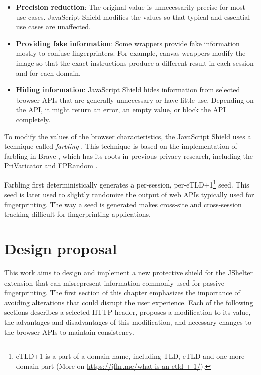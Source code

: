 \begin{itemize}
	\item \textbf{Precision reduction}: The original value is unnecessarily precise for most use cases. JavaScript Shield modifies the values so that typical and essential use cases are unaffected.
	\item \textbf{Providing fake information}: Some wrappers provide fake information mostly to confuse fingerprinters. For example, canvas wrappers modify the image so that the exact instructions produce a different result in each session and for each domain.
	\item \textbf{Hiding information}: JavaScript Shield hides information from selected browser APIs that are generally unnecessary or have little use. Depending on the API, it might return an error, an empty value, or block the API completely.
\end{itemize}

To modify the values of the browser characteristics, the JavaScript Shield uses a technique called \emph{farbling} \cite{JShelterPaper}. This technique is based on the implementation of farbling in Brave \cite{BraveFingerprintingDefences2}, which has its roots in previous privacy research, including the PriVaricator \cite{PriVaricator} and FPRandom \cite{FPRandom}.

Farbling first deterministically generates a per-session, per-eTLD+1\footnote{eTLD+1 is a part of a domain name, including TLD, eTLD and one more domain part (More on \url{https://jfhr.me/what-is-an-etld-+-1/}).} seed. This seed is later used to slightly randomize the output of web APIs typically used for fingerprinting. The way a seed is generated makes cross-site and cross-session tracking difficult for fingerprinting applications.


\chapter{Design proposal}
\label{Chapter:Design}

This work aims to design and implement a new protective shield for the JShelter extension that can misrepresent information commonly used for passive fingerprinting. The first section of this chapter emphasizes the importance of avoiding alterations that could disrupt the user experience. Each of the following sections describes a selected HTTP header, proposes a modification to its value, the advantages and disadvantages of this modification, and necessary changes to the browser APIs to maintain consistency.

